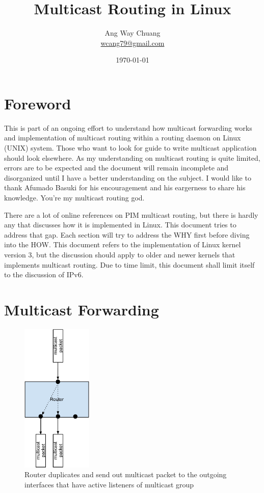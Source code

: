 \documentclass{article}
\begin{document}
\title{Multicast Routing in Linux}
\author{Ang Way Chuang \\
\small{\href{mailto:wcang79@gmail.com}{wcang79@gmail.com}}}
\date{\today}
\maketitle
\section{Foreword}
This is part of an ongoing effort to understand how multicast forwarding works
and implementation of multicast routing within a routing daemon on Linux (UNIX)
system. Those who want to look for guide to write multicast application should
look elsewhere. As my understanding on multicast routing is quite limited,
errors are to be expected and the document will remain incomplete and
disorganized until I have a better understanding on the subject. I would like to
thank Afumado Basuki for his encouragement and his eargerness to share his
knowledge. You're my multicast routing god.

There are a lot of online references on PIM multicast routing, but there is
hardly any that discusses how it is implemented in Linux. This document tries to
address that gap. Each section will try to address the WHY first before diving
into the HOW. This document refers to the implementation of Linux kernel version
3, but the discussion should apply to older and newer kernels that implements
multicast routing. Due to time limit, this document shall limit itself to the
discussion of IPv6.

\section{Multicast Forwarding}
\begin{figure}[h]
  \begin{center}
    \includegraphics[width=0.3\textwidth]{mcast-forward}
    \caption{Router duplicates and send out multicast packet to the
    outgoing interfaces that have active listeners of multicast group}
    \label{fig:mcast-forward}
  \end{center}
\end{figure}
\end{document}
